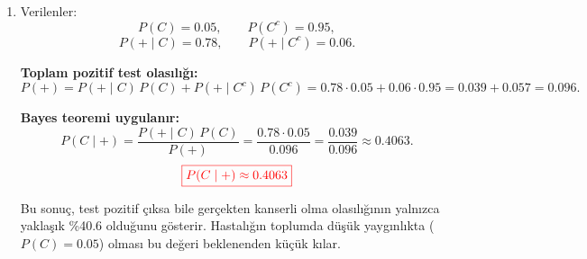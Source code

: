 \documentclass[12pt,a4paper]{article}
\begin{document}
\begin{enumerate}
\begin{enumerate}
\item \textbf{Dağılım fonksiyonu $F(x)$:}
\[
F(x)=\int_{1}^{x}\frac{1}{6}(t+1)\,dt
=\frac{1}{6}\left[\frac{t^2}{2}+t\right]_{1}^{x}
=\frac{1}{6}\left(\frac{x^2}{2}+x-\frac{3}{2}\right)
=\frac{x^2+2x-3}{12}.
\]
\[
{\color{red}\boxed{F(x)=
\begin{cases}
0, & x\le 1,\\[4pt]
\dfrac{x^2+2x-3}{12}, & 1<x<3,\\[4pt]
1, & x\ge 3.
\end{cases}}}
\]
\end{enumerate}

\item Verilenler:
\[
P(C)=0.05,\qquad P(C^c)=0.95,
\]
\[
P(+\mid C)=0.78,\qquad P(+\mid C^c)=0.06.
\]

\begin{center}
\end{center}

\textbf{Toplam pozitif test olasılığı:}
\[
P(+)=P(+\mid C)\,P(C)+P(+\mid C^c)\,P(C^c)
=0.78\cdot0.05+0.06\cdot0.95
=0.039+0.057=0.096.
\]

\textbf{Bayes teoremi uygulanır:}
\[
P(C\mid +)=\frac{P(+\mid C)\,P(C)}{P(+)}=\frac{0.78\cdot0.05}{0.096}=\frac{0.039}{0.096}\approx 0.4063.
\]
\[
{\color{red}\boxed{P(C\mid +)\approx 0.4063}}
\]

Bu sonuç, test pozitif çıksa bile gerçekten kanserli olma olasılığının yalnızca yaklaşık \%40.6 olduğunu gösterir. Hastalığın toplumda düşük yaygınlıkta ($P(C)=0.05$) olması bu değeri beklenenden küçük kılar.

\end{enumerate}
\end{document}
